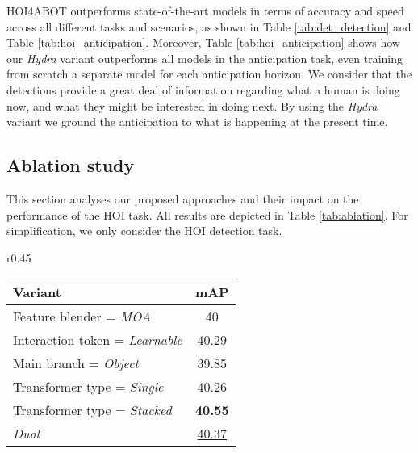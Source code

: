\documentclass{article}
\begin{document}
HOI4ABOT outperforms state-of-the-art models \citep{Chiou2021, tamura_cvpr2021, Tu2022,  Cong2021, NI2023103741} in terms of accuracy and speed across all different tasks and scenarios, as shown in Table \ref{tab:det_detection} and Table \ref{tab:hoi_anticipation}. Moreover, Table \ref{tab:hoi_anticipation} shows how our \textit{Hydra} variant outperforms all models in the anticipation task, even training from scratch a separate model for each anticipation horizon. We consider that the detections provide a great deal of information regarding what a human is doing now, and what they might be interested in doing next. By using the \textit{Hydra} variant we ground the anticipation to what is happening at the present time.

\subsection{Ablation study}
This section analyses our proposed approaches and their impact on the performance of the HOI task. All results are depicted in Table \ref{tab:ablation}. For simplification, we only consider the HOI detection task. 

\begin{wraptable}{r}{0.45\linewidth}
\centering
    \caption{Albation study in HOI detection.}
        \begin{tabular}{lc}
        \toprule
        Variant                    & mAP           \\
        \midrule
        Feature blender = \textit{MOA}         & 40                              \\
        Interaction token = \textit{Learnable} & 40.29                           \\
        Main branch = \textit{Object}          & 39.85                           \\
        \midrule
        Transformer type = \textit{Single}     & 40.26                           \\
        Transformer type = \textit{Stacked}    & \textbf{40.55}                  \\
        \textit{Dual}                          & \uline{40.37}                  \\
        \bottomrule
        \end{tabular}\vspace{-0.5cm}
    \label{tab:ablation}
\end{wraptable}
 
\end{document}
